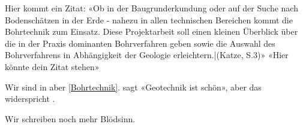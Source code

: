 Hier kommt ein Zitat: «Ob in der Baugrunderkundung oder auf der Suche nach Bodenschätzen in der Erde - nahezu in allen technischen Bereichen kommt die Bohrtechnik zum Einsatz. Diese Projektarbeit soll einen kleinen Überblick über die in der Praxis dominanten Bohrverfahren geben sowie die Auswahl des Bohrverfahrens in Abhängigkeit der Geologie erleichtern.|(Katze, S.3)» «Hier könnte dein Zitat stehen» 

Wir sind in  aber \cref{Bohrtechnik}. \textcite{ziegler2012geotechnische} sagt «Geotechnik ist schön», aber das widerspricht \cite{ziegler2012geotechnische}.

Wir schreiben noch mehr Blödsinn.